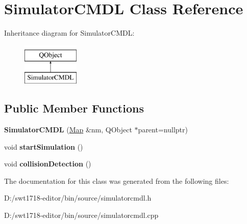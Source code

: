 \hypertarget{class_simulator_c_m_d_l}{}\section{Simulator\+C\+M\+DL Class Reference}
\label{class_simulator_c_m_d_l}
Inheritance diagram for Simulator\+C\+M\+DL\+:\begin{figure}[H]
\begin{center}
\leavevmode
\includegraphics[height=2.000000cm]{class_simulator_c_m_d_l}
\end{center}
\end{figure}
\subsection*{Public Member Functions}
\begin{DoxyCompactItemize}
\item 
\mbox{\label{class_simulator_c_m_d_l_a5059deaae21230537c97903334f2a241}} 
{\bfseries Simulator\+C\+M\+DL} (\mbox{\hyperlink{class_map}{Map}} \&nm, Q\+Object $\ast$parent=nullptr)
\item 
\mbox{\label{class_simulator_c_m_d_l_a60563f572993ad933245ed6e524776ca}} 
void {\bfseries start\+Simulation} ()
\item 
\mbox{\label{class_simulator_c_m_d_l_ae84c6d1eef2acea326ebefef2655d099}} 
void {\bfseries collision\+Detection} ()
\end{DoxyCompactItemize}


The documentation for this class was generated from the following files\+:\begin{DoxyCompactItemize}
\item 
D\+:/swt1718-\/editor/bin/source/simulatorcmdl.\+h\item 
D\+:/swt1718-\/editor/bin/source/simulatorcmdl.\+cpp\end{DoxyCompactItemize}
